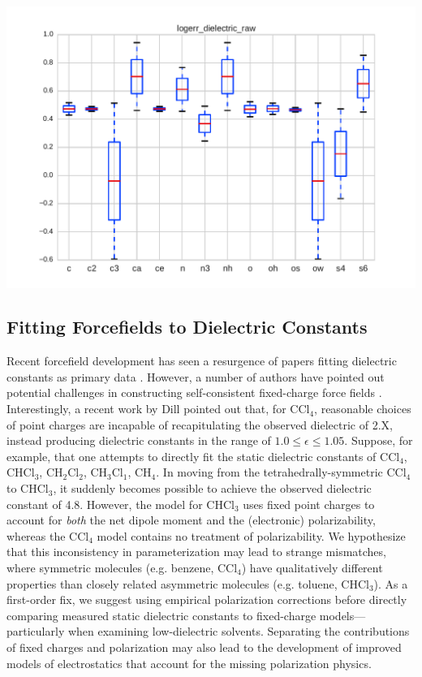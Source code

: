 \documentclass[journal=jacsat,manuscript=article]{achemso}
\begin{document}
\includegraphics[width=\columnwidth]{./figures/functional_group_logerr_dielectric_raw.pdf}

\subsection{Fitting Forcefields to Dielectric Constants}

Recent forcefield development has seen a resurgence of papers fitting dielectric constants as primary data \cite{wang2014building, fennell2014fixed}.  However, a number of authors have pointed out potential challenges in constructing self-consistent fixed-charge force fields \cite{fennell2012simple, leontyev2014polarizable}.  Interestingly, a recent work by Dill \cite{fennell2012simple} pointed out that, for $\mathrm{CCl_4}$, reasonable choices of point charges are incapable of recapitulating the observed dielectric of 2.X, instead producing dielectric constants in the range of $1.0 \le \epsilon \le 1.05$.  Suppose, for example, that one attempts to directly fit the static dielectric constants of $\mathrm{CCl_4}$, $\mathrm{CHCl_3}$, $\mathrm{CH_2Cl_2}$, $\mathrm{CH_3Cl_1}$, $\mathrm{CH_4}$.  In moving from the tetrahedrally-symmetric $\mathrm{CCl_4}$ to $\mathrm{CHCl_3}$, it suddenly becomes possible to achieve the observed dielectric constant of 4.8.  However, the model for $\mathrm{CHCl_3}$ uses fixed point charges to account for \emph{both} the net dipole moment and the (electronic) polarizability, whereas the $\mathrm{CCl_4}$ model contains no treatment of polarizability.  We hypothesize that this inconsistency in parameterization may lead to strange mismatches, where symmetric molecules (e.g. benzene, $\mathrm{CCl_4}$) have qualitatively different properties than closely related asymmetric molecules (e.g. toluene, $\mathrm{CHCl_3}$).  As a first-order fix, we suggest using empirical polarization corrections before directly comparing measured static dielectric constants to fixed-charge models---particularly when examining low-dielectric solvents.  Separating the contributions of fixed charges and polarization may also lead to the development of improved models of electrostatics that account for the missing polarization physics.
\end{document}
